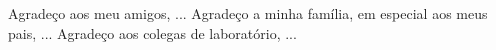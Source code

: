 Agradeço aos meu amigos, ... Agradeço a minha família, em especial aos meus pais, ...
Agradeço aos colegas de laboratório, ...